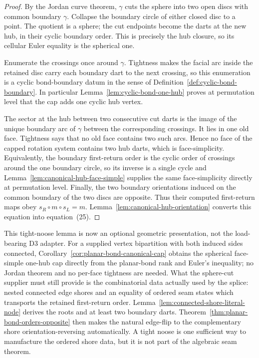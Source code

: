 \begin{proof}
By the Jordan curve theorem, \(\gamma\) cuts the sphere into two open discs
with common boundary \(\gamma\).  Collapse the boundary circle of either
closed disc to a point.  The quotient is a sphere; the cut endpoints become
the darts at the new hub, in their cyclic boundary order.  This is precisely
the hub closure, so its cellular Euler equality is the spherical one.

Enumerate the crossings once around \(\gamma\).  Tightness makes the facial
arc inside the retained disc carry each boundary dart to the next crossing,
so this enumeration is a cyclic bond-boundary datum in the sense of
Definition~\ref{def:cyclic-bond-boundary}.  In particular
Lemma~\ref{lem:cyclic-bond-one-hub} proves at permutation level that the cap
adds one cyclic hub vertex.

The sector at the hub between two consecutive cut darts is the image of the
unique boundary arc of \(\gamma\) between the corresponding crossings.  It
lies in one old face.  Tightness says that no old face contains two such
arcs.  Hence no face of the capped rotation system contains two hub darts,
which is face-simplicity.  Equivalently, the boundary first-return order is
the cyclic order of crossings around the one boundary circle, so its inverse
is a single cycle and Lemma~\ref{lem:canonical-hub-face-simple} supplies the
same face-simplicity directly at permutation level.  Finally, the two boundary orientations induced on
the common boundary of the two discs are opposite.  Thus their computed
first-return maps obey \(s_R\circ m\circ s_L=m\).
Lemma~\ref{lem:canonical-hub-orientation} converts this equation into
equation~(25).
\end{proof}

This tight-noose lemma is now an optional geometric presentation, not the
load-bearing D3 adapter.  For a supplied vertex bipartition with both induced
sides connected, Corollary~\ref{cor:planar-bond-canonical-cap} obtains the
spherical face-simple one-hub cap directly from the planar-bond rank and
Euler's inequality; no Jordan theorem and no per-face tightness are needed.
What the sphere-cut supplier must still provide is the combinatorial data
actually used by the splice: nested connected edge shores and an equality of
ordered seam states which transports the retained first-return order.
Lemma~\ref{lem:connected-shore-literal-node} derives the roots and at least two
boundary darts.  Theorem~\ref{thm:planar-bond-orders-opposite} then makes
the natural edge-flip to the complementary shore orientation-reversing
automatically.  A tight noose is one sufficient way to manufacture the
ordered shore data, but it is not part of the algebraic seam theorem.

